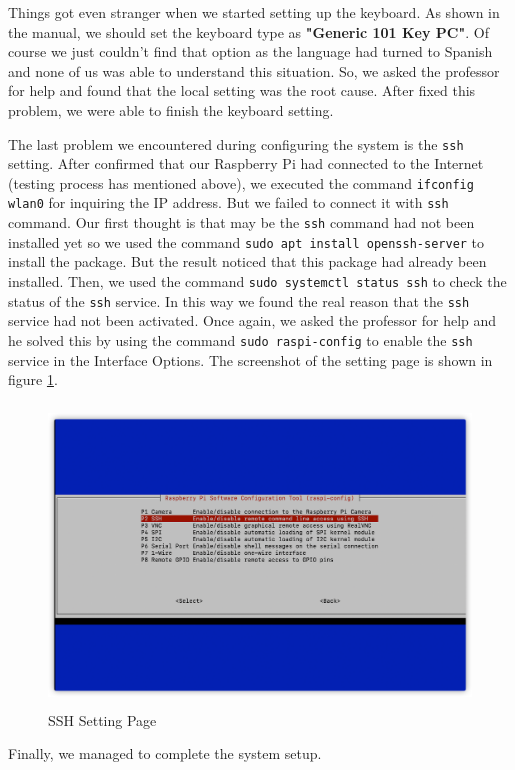 \documentclass[12pt]{report}
\newcommand{\code}[1]{\colorbox{light-gray}{\texttt{#1}}}
\begin{document}
Things got even stranger when we started setting up the keyboard. As shown in the manual, we should set the keyboard type as \textbf{"Generic 101 Key PC"}.  Of course we just couldn't find that option as the language had turned to Spanish and none of us was able to understand this situation. So, we asked the professor for help and found that the local setting was the root cause. After fixed this problem, we were able to finish the keyboard setting.\par
The last problem we encountered during configuring the system is the \code{ssh} setting. After confirmed that our Raspberry Pi had connected to the Internet (testing process has mentioned above), we executed the command \code{ifconfig wlan0} for inquiring the IP address. But we failed to connect it with \code{ssh} command. Our first thought is that may be the \code{ssh} command had not been installed yet so we used the command \code{sudo apt install openssh-server} to install the package. But the result noticed that this package had already been installed. Then, we used the command \code{sudo systemctl status ssh} to check the status of the \code{ssh} service. In this way we found the real reason that the \code{ssh} service had not been activated. Once again, we asked the professor for help and he solved this by using the command \code{sudo raspi-config} to enable the \code{ssh} service in the Interface Options. The screenshot of the setting page is shown in figure \ref{fig:fig3}.
\begin{figure}[H]
    \includegraphics[width=12cm, height = 8cm]{img/Figure3.png}
    \centering
    \caption{SSH Setting Page}
    \label{fig:fig3}
\end{figure}
Finally, we managed to complete the system setup. \vspace{-1em}
\end{document}
